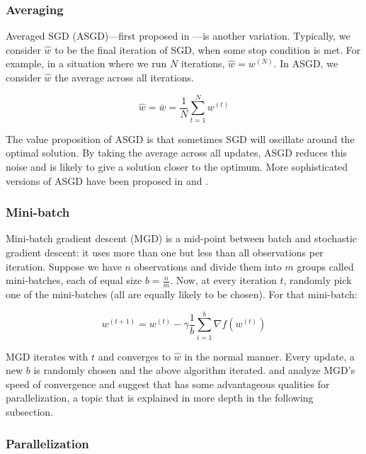 \documentclass{article}
\begin{document}
\subsubsection{Averaging}

Averaged SGD (ASGD)---first proposed in 
\cite{polyak1992acceleration}---is another variation. Typically, we consider
$\hat{w}$ to be the final iteration
of SGD, when some stop condition is met. For example, in a situation where we
run $N$ iterations, $\hat{w} = w^{(N)}$. In ASGD, we consider $\hat{w}$ 
the average across all iterations.

\begin{equation}
	\hat{w} = \bar{w} = \frac{1}{N} \sum_{t=1}^N w^{(t)}
\end{equation}

The value proposition of ASGD is that sometimes SGD will oscillate around the
optimal solution. By taking the average across all updates, ASGD reduces this
noise and is likely to give a solution closer to the optimum. More sophisticated
versions of ASGD have been proposed in 
\cite{zhang2004solving}
and 
\cite{xu2011towards}. 

\subsubsection{Mini-batch}

Mini-batch gradient descent (MGD) is a mid-point between batch
and stochastic gradient descent: it uses more than one but less than all
observations per iteration. Suppose we have $n$ observations and divide them
into $m$ groups called mini-batches, each of equal size $b=\frac{n}{m}$. Now, at
every iteration $t$, randomly pick one of the mini-batches (all are equally
likely to be chosen). For that mini-batch:

\begin{equation}
	w^{(t+1)} = w^{(t)} - \gamma \frac{1}{b} \sum_{i=1}^b \nabla f(w^{(t)})
\end{equation}

MGD iterates with $t$ and converges to $\hat{w}$ in the normal manner. Every
update, a new $b$ is randomly chosen and the above algorithm iterated. 
\cite{dekel2012optimal} and \cite{li2014efficient} analyze MGD's speed of
convergence and suggest that has some advantageous qualities for
parallelization, a topic that is explained in more depth in the following
subsection.

\subsubsection{Parallelization}
\end{document}
